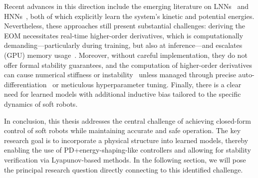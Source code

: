 Recent advances in this direction include the emerging literature on \glspl{LNN}~\cite{lutter2019deep, cranmer2020lagrangian, liu2024physics} and \glspl{HNN}~\cite{greydanus2019hamiltonian, liu2024physics}, both of which explicitly learn the system’s kinetic and potential energies. Nevertheless, these approaches still present substantial challenges: deriving the \gls{EOM} necessitates real-time higher-order derivatives, which is computationally demanding—particularly during training, but also at inference—and escalates (GPU) memory usage~\cite{lutter2019deep}. Moreover, without careful implementation, they do not offer formal stability guarantees, and the computation of higher-order derivatives can cause numerical stiffness or instability~\cite{greydanus2019hamiltonian} unless managed through precise auto-differentiation~\cite{rumelhart1986learning} or meticulous hyperparameter tuning. Finally, there is a clear need for learned models with additional inductive bias tailored to the specific dynamics of soft robots.

In conclusion, this thesis addresses the central challenge of achieving closed-form control of soft robots while maintaining accurate and safe operation. The key research goal is to incorporate a physical structure into learned models, thereby enabling the use of PD+energy-shaping-like controllers and allowing for stability verification via Lyapunov-based methods. In the following section, we will pose the principal research question directly connecting to this identified challenge.

